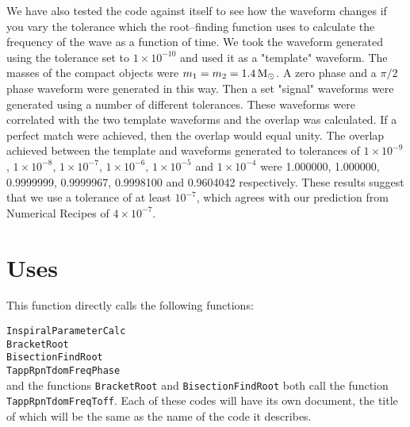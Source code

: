 \documentclass[12pt]{article}
\begin{document}
We have also tested the code against itself to see how the waveform changes if you vary the tolerance which the root--finding function uses to calculate the frequency of the wave as a function of time. We took the waveform generated using the tolerance set to $1 \times 10^{-10}$ and used it as a "template" waveform. The masses of the compact objects were $m_{1}=m_{2}=1.4 \, \rm{M_{\odot}}$. A zero phase and a $\pi/2$ phase waveform were generated in this way. Then a set "signal" waveforms were generated using a number of different tolerances. These waveforms were correlated with the two template waveforms and the overlap was calculated. If a perfect match were achieved, then the overlap would equal unity. The overlap achieved between the template and waveforms generated to tolerances of $1 \times 10^{-9}$, $1 \times 10^{-8}$, $1 \times 10^{-7}$, $1 \times 10^{-6}$, $1 \times 10^{-5}$ and $1 \times 10^{-4}$ were 1.000000, 1.000000, 0.9999999, 0.9999967, 0.9998100 and 0.9604042 respectively. These results suggest that we use a tolerance of at least $10^{-7}$, which agrees with our prediction from Numerical Recipes of $4 \times 10^{-7}$.



\section{Uses}

This function directly calls the following functions:

\vspace{5mm}

\noindent
\texttt{InspiralParameterCalc} \\
\texttt{BracketRoot} \\
\texttt{BisectionFindRoot} \\
\texttt{TappRpnTdomFreqPhase} \\

and the functions \texttt{BracketRoot} and \texttt{BisectionFindRoot} both call the function \\ \texttt{TappRpnTdomFreqToff}. Each of these codes will have its own document, the title of which will be the same as the name of the code it describes.
\end{document}

